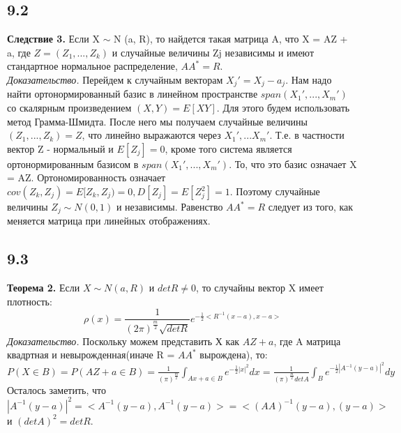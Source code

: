 \subsection*{9.2}
\textbf{Следствие 3.} Если X $\sim$ N (a, R), то найдется такая матрица A, что X = AZ + a, где
$Z = (Z_1, ..., Z_k)$ и случайные величины Zj независимы и имеют стандартное нормальное распределение, $AA^* = R$.\\
\textit{Доказательство.} Перейдем к случайным векторам $X_j' = X_j - a_j$. Нам надо найти ортонормированный базис в линейном пространстве $span(X_1', ..., X_m')$ со скалярным произведением $(X, Y) = E[XY]$. Для этого будем использовать метод Грамма-Шмидта. После него мы получаем случайные величины $(Z_1, ..., Z_k) = Z$, что линейно выражаются через $X_1', ... X_m'$. Т.е. в частности вектор Z - нормальный и $E[Z_j] = 0$, кроме того система является ортонормированным базисом в $span(X_1', ..., X_m')$. То, что это базис означает X = AZ. Ортономированность означает $cov(Z_k, Z_j) = E[Z_k, Z_j) = 0, D[Z_j] = E[Z_j^2] = 1$. Поэтому случайные величины $Z_j \sim N(0, 1)$ и независимы. Равенство $AA^* = R$ следует из того, как меняется матрица при линейных отображениях.
\\
\subsection*{9.3}
\textbf{Теорема 2.} Если $X\sim N(a, R)$ и $detR \neq 0$, то случайны вектор X имеет плотность:\\
$$\rho(x) = \frac{1}{(2\pi)^{\frac{m}{2}} \sqrt{detR}}e^{-\frac{1}{2}<R^{-1}(x - a), x - a>}$$
\textit{Доказательство.} Поскольку можем представить Х как $AZ + a$, где A матрица квадртная и невырожденная(иначе R = $AA^*$ вырождена), то:\\
$P(X \in B) = P(AZ + a \in B) = \frac{1}{(\pi)^{\frac{m}{2}}}\int_{Ax + a \in B} e^{-\frac{1}{2}|x|^2}dx = \frac{1}{(\pi)^{\frac{m}{2}}detA}\int_{B} e^{-\frac{1}{2}|A^{-1}(y - a)|^2}dy$\\
Осталось заметить, что $|A^{-1}(y - a)|^2 = <A^{-1}(y - a), A^{-1}(y - a)> = <(AA)^{-1}(y - a), (y - a)>$ и $(detA)^2 = detR$.
